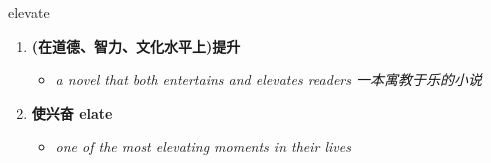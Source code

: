 
\begin{frame}
{\huge elevate}
\begin{center}
\begin{enumerate}\Large
  \item \textbf{(在道德、智力、文化水平上)提升}
  \begin{itemize}
    \item \em{\Large{a novel that both entertains and elevates readers 一本寓教于乐的小说}}
  \end{itemize}
  \item \textbf{使兴奋 elate}
  \begin{itemize}
    \item \em{\Large{one of the most elevating moments in their lives}}
  \end{itemize}
\end{enumerate}
\end{center}
\end{frame}
